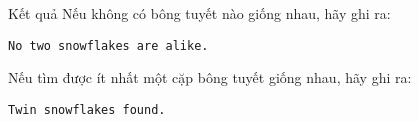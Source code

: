 Kết quả  
Nếu không có bông tuyết nào giống nhau, hãy ghi ra:  
\begin{verbatim}
No two snowflakes are alike.\end{verbatim}

   Nếu tìm được ít nhất một cặp bông tuyết giống nhau, hãy ghi ra:  
\begin{verbatim}
Twin snowflakes found.\end{verbatim}